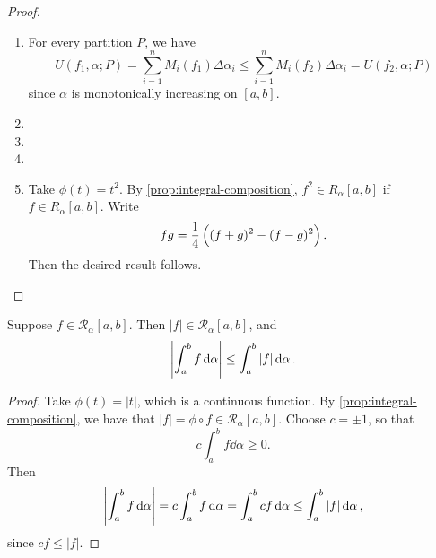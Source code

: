 \begin{proof}
\begin{enumerate}[label=(\roman*)]
\item For every partition $P$, we have
\[U(f_1,\alpha;P)=\sum_{i=1}^{n}M_i(f_1)\Delta\alpha_i\le\sum_{i=1}^{n}M_i(f_2)\Delta\alpha_i=U(f_2,\alpha;P)\]
since $\alpha$ is monotonically increasing on $[a,b]$.

\item 
\item 
\item 
\item Take $\phi(t)=t^2$. By \cref{prop:integral-composition}, $f^2\in R_\alpha[a,b]$ if $f\in R_\alpha[a,b]$. Write
\[fg=\frac{1}{4}\left((f+g)^2-(f-g)^2\right).\]
Then the desired result follows.
\end{enumerate}
\end{proof}

\begin{lemma}
Suppose $f\in\mathcal{R}_\alpha[a,b]$. Then $|f|\in \mathcal{R}_\alpha[a,b]$, and
\[\left|\int_a^bf\dd{\alpha}\right|\le\int_a^b|f|\dd{\alpha}.\]
\end{lemma}

\begin{proof}
Take $\phi(t)=|t|$, which is a continuous function. By \cref{prop:integral-composition}, we have that $|f|=\phi\circ f\in\mathcal{R}_\alpha[a,b]$. Choose $c=\pm1$, so that
\[c\int_{a}^{b}f\dd{\alpha}\ge0.\]
Then
\[\left|\int_{a}^{b}f\dd{\alpha}\right|=c\int_{a}^{b}f\dd{\alpha}=\int_{a}^{b}cf\dd{\alpha}\le\int_{a}^{b}|f|\dd{\alpha},\]
since $cf\le|f|$.
\end{proof}

